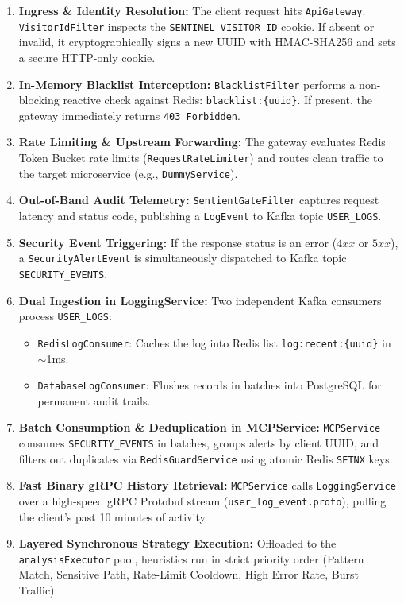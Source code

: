 \documentclass[12pt, a4paper]{article}
\newcommand{\tech}[1]{\texttt{\color{accentblue}#1}}
\newcommand{\service}[1]{\texttt{\color{accentteal}#1}}
\begin{document}
\begin{enumerate}[leftmargin=*, itemsep=5pt]
    \item \textbf{Ingress \& Identity Resolution:} The client request hits \service{ApiGateway}. \tech{VisitorIdFilter} inspects the \texttt{SENTINEL\_VISITOR\_ID} cookie. If absent or invalid, it cryptographically signs a new UUID with HMAC-SHA256 and sets a secure HTTP-only cookie.
    \item \textbf{In-Memory Blacklist Interception:} \tech{BlacklistFilter} performs a non-blocking reactive check against Redis: \texttt{blacklist:\{uuid\}}. If present, the gateway immediately returns \texttt{403 Forbidden}.
    \item \textbf{Rate Limiting \& Upstream Forwarding:} The gateway evaluates Redis Token Bucket rate limits (\texttt{RequestRateLimiter}) and routes clean traffic to the target microservice (e.g., \service{DummyService}).
    \item \textbf{Out-of-Band Audit Telemetry:} \tech{SentientGateFilter} captures request latency and status code, publishing a \tech{LogEvent} to Kafka topic \texttt{USER\_LOGS}.
    \item \textbf{Security Event Triggering:} If the response status is an error ($4xx$ or $5xx$), a \tech{SecurityAlertEvent} is simultaneously dispatched to Kafka topic \texttt{SECURITY\_EVENTS}.
    \item \textbf{Dual Ingestion in LoggingService:} Two independent Kafka consumers process \texttt{USER\_LOGS}:
    \begin{itemize}[noitemsep]
        \item \tech{RedisLogConsumer}: Caches the log into Redis list \texttt{log:recent:\{uuid\}} in $\sim$1ms.
        \item \tech{DatabaseLogConsumer}: Flushes records in batches into PostgreSQL for permanent audit trails.
    \end{itemize}
    \item \textbf{Batch Consumption \& Deduplication in MCPService:} \service{MCPService} consumes \texttt{SECURITY\_EVENTS} in batches, groups alerts by client UUID, and filters out duplicates via \tech{RedisGuardService} using atomic Redis \texttt{SETNX} keys.
    \item \textbf{Fast Binary gRPC History Retrieval:} \service{MCPService} calls \service{LoggingService} over a high-speed gRPC Protobuf stream (\texttt{user\_log\_event.proto}), pulling the client's past 10 minutes of activity.
    \item \textbf{Layered Synchronous Strategy Execution:} Offloaded to the \texttt{analysisExecutor} pool, heuristics run in strict priority order (Pattern Match, Sensitive Path, Rate-Limit Cooldown, High Error Rate, Burst Traffic).

\end{enumerate}
\end{document}
